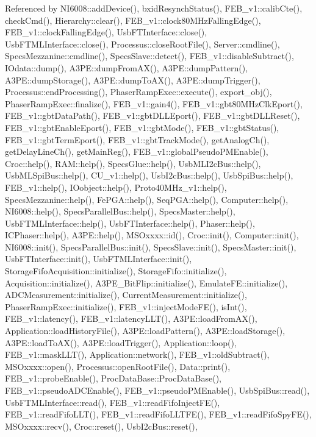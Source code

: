 Referenced by N\+I6008\+::add\+Device(), bxid\+Resynch\+Status(), F\+E\+B\+\_\+v1\+::calib\+Cte(), check\+Cmd(), Hierarchy\+::clear(), F\+E\+B\+\_\+v1\+::clock80\+M\+Hz\+Falling\+Edge(), F\+E\+B\+\_\+v1\+::clock\+Falling\+Edge(), Usb\+F\+T\+Interface\+::close(), Usb\+F\+T\+M\+L\+Interface\+::close(), Processus\+::close\+Root\+File(), Server\+::cmdline(), Specs\+Mezzanine\+::cmdline(), Specs\+Slave\+::detect(), F\+E\+B\+\_\+v1\+::disable\+Subtract(), I\+Odata\+::dump(), A3\+P\+E\+::dump\+From\+A\+X(), A3\+P\+E\+::dump\+Pattern(), A3\+P\+E\+::dump\+Storage(), A3\+P\+E\+::dump\+To\+A\+X(), A3\+P\+E\+::dump\+Trigger(), Processus\+::end\+Processing(), Phaser\+Ramp\+Exec\+::execute(), export\+\_\+obj(), Phaser\+Ramp\+Exec\+::finalize(), F\+E\+B\+\_\+v1\+::gain4(), F\+E\+B\+\_\+v1\+::gbt80\+M\+Hz\+Clk\+Eport(), F\+E\+B\+\_\+v1\+::gbt\+Data\+Path(), F\+E\+B\+\_\+v1\+::gbt\+D\+L\+L\+Eport(), F\+E\+B\+\_\+v1\+::gbt\+D\+L\+L\+Reset(), F\+E\+B\+\_\+v1\+::gbt\+Enable\+Eport(), F\+E\+B\+\_\+v1\+::gbt\+Mode(), F\+E\+B\+\_\+v1\+::gbt\+Status(), F\+E\+B\+\_\+v1\+::gbt\+Term\+Eport(), F\+E\+B\+\_\+v1\+::gbt\+Track\+Mode(), get\+Analog\+Ch(), get\+Delay\+Line\+Ch(), get\+Main\+Reg(), F\+E\+B\+\_\+v1\+::global\+Pseudo\+P\+M\+Enable(), Croc\+::help(), R\+A\+M\+::help(), Specs\+Glue\+::help(), Usb\+M\+L\+I2c\+Bus\+::help(), Usb\+M\+L\+Spi\+Bus\+::help(), C\+U\+\_\+v1\+::help(), Usb\+I2c\+Bus\+::help(), Usb\+Spi\+Bus\+::help(), F\+E\+B\+\_\+v1\+::help(), I\+Oobject\+::help(), Proto40\+M\+Hz\+\_\+v1\+::help(), Specs\+Mezzanine\+::help(), Fe\+P\+G\+A\+::help(), Seq\+P\+G\+A\+::help(), Computer\+::help(), N\+I6008\+::help(), Specs\+Parallel\+Bus\+::help(), Specs\+Master\+::help(), Usb\+F\+T\+M\+L\+Interface\+::help(), Usb\+F\+T\+Interface\+::help(), Phaser\+::help(), I\+C\+Phaser\+::help(), A3\+P\+E\+::help(), M\+S\+Oxxxx\+::id(), Croc\+::init(), Computer\+::init(), N\+I6008\+::init(), Specs\+Parallel\+Bus\+::init(), Specs\+Slave\+::init(), Specs\+Master\+::init(), Usb\+F\+T\+Interface\+::init(), Usb\+F\+T\+M\+L\+Interface\+::init(), Storage\+Fifo\+Acquisition\+::initialize(), Storage\+Fifo\+::initialize(), Acquisition\+::initialize(), A3\+P\+E\+\_\+\+Bit\+Flip\+::initialize(), Emulate\+F\+E\+::initialize(), A\+D\+C\+Measurement\+::initialize(), Current\+Measurement\+::initialize(), Phaser\+Ramp\+Exec\+::initialize(), F\+E\+B\+\_\+v1\+::inject\+Mode\+F\+E(), is\+Int(), F\+E\+B\+\_\+v1\+::latency(), F\+E\+B\+\_\+v1\+::latency\+L\+L\+T(), A3\+P\+E\+::load\+From\+A\+X(), Application\+::load\+History\+File(), A3\+P\+E\+::load\+Pattern(), A3\+P\+E\+::load\+Storage(), A3\+P\+E\+::load\+To\+A\+X(), A3\+P\+E\+::load\+Trigger(), Application\+::loop(), F\+E\+B\+\_\+v1\+::mask\+L\+L\+T(), Application\+::network(), F\+E\+B\+\_\+v1\+::old\+Subtract(), M\+S\+Oxxxx\+::open(), Processus\+::open\+Root\+File(), Data\+::print(), F\+E\+B\+\_\+v1\+::probe\+Enable(), Proc\+Data\+Base\+::\+Proc\+Data\+Base(), F\+E\+B\+\_\+v1\+::pseudo\+A\+D\+C\+Enable(), F\+E\+B\+\_\+v1\+::pseudo\+P\+M\+Enable(), Usb\+Spi\+Bus\+::read(), Usb\+F\+T\+M\+L\+Interface\+::read(), F\+E\+B\+\_\+v1\+::read\+Fifo\+Inject\+F\+E(), F\+E\+B\+\_\+v1\+::read\+Fifo\+L\+L\+T(), F\+E\+B\+\_\+v1\+::read\+Fifo\+L\+L\+T\+F\+E(), F\+E\+B\+\_\+v1\+::read\+Fifo\+Spy\+F\+E(), M\+S\+Oxxxx\+::recv(), Croc\+::reset(), Usb\+I2c\+Bus\+::reset(), 